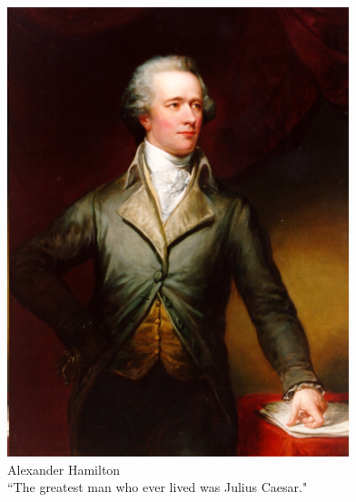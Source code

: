 \begin{frame}
    \begin{columns}[c]
            \centering
            \includegraphics[height=0.60\textheight]{img/hamilton-portrait.png} \\
            Alexander Hamilton \\
        \column{0.5\textheight}
            ``The greatest man who ever lived was Julius Caesar."
    \end{columns}
\end{frame}

